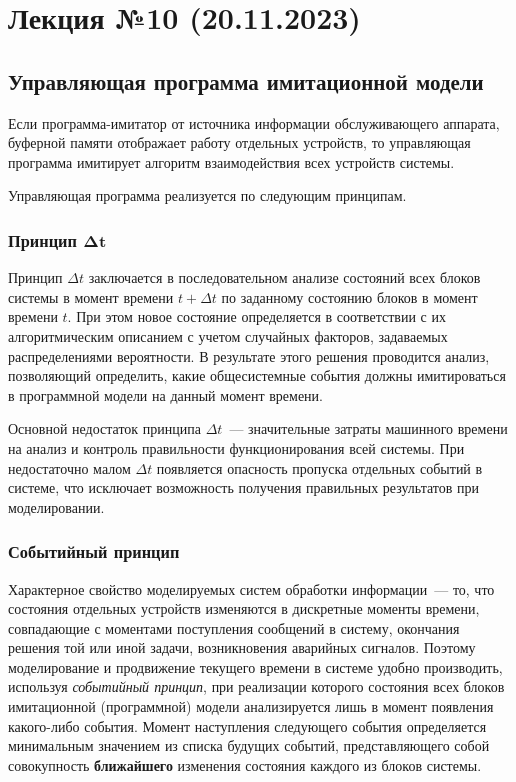 \section{Лекция №10 (20.11.2023)}

\subsection{Управляющая программа имитационной модели}

Если программа-имитатор от источника информации обслуживающего аппарата, буферной памяти отображает работу отдельных устройств, то управляющая программа имитирует алгоритм взаимодействия всех устройств системы.

Управляющая программа реализуется по следующим принципам.

\subsubsection{Принцип $\mathbf{\Delta t}$}

Принцип $\Delta t$ заключается в последовательном анализе состояний всех блоков системы в момент времени ${t + \Delta t}$ по заданному состоянию блоков в момент времени $t$. При этом новое состояние определяется в соответствии с их алгоритмическим описанием с учетом случайных факторов, задаваемых распределениями вероятности. В результате этого решения проводится анализ, позволяющий определить, какие общесистемные события должны имитироваться в программной модели на данный момент времени.

Основной недостаток принципа $\Delta t$~--- значительные затраты машинного времени на анализ и контроль правильности функционирования всей системы. При недостаточно малом $\Delta t$ появляется опасность пропуска отдельных событий в системе, что исключает возможность получения правильных результатов при моделировании.

\subsubsection{Событийный принцип}

Характерное свойство моделируемых систем обработки информации~--- то, что состояния отдельных устройств изменяются в дискретные моменты времени, совпадающие с моментами поступления сообщений в систему, окончания решения той или иной задачи, возникновения аварийных сигналов. Поэтому моделирование и
продвижение текущего времени в системе удобно производить, используя \textit{событийный принцип}, при реализации которого состояния всех блоков имитационной (программной) модели анализируется лишь в момент появления какого-либо события. Момент наступления следующего события определяется минимальным значением из списка будущих событий, представляющего собой совокупность \textbf{ближайшего} изменения состояния каждого из блоков системы.

